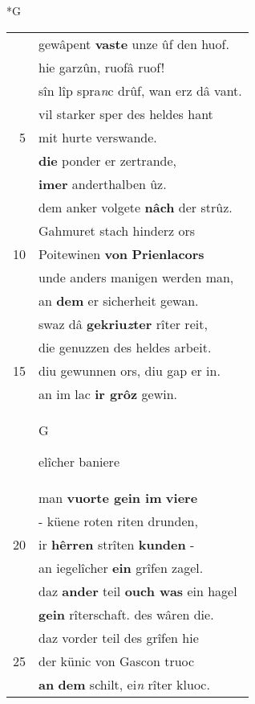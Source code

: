 \documentclass[8pt,a4paper,notitlepage]{article}
\begin{document}
\begin{table}[ht]
\begin{minipage}[t]{0.5\linewidth}
\end{minipage}
\end{table}
\newpage
\begin{table}[ht]
\begin{minipage}[t]{0.5\linewidth}
\small
\begin{center}*G
\end{center}
\begin{tabular}{rl}
 & gewâpent \textbf{vaste} unze ûf den huof.\\ 
 & hie garzûn, ruofâ ruof!\\ 
 & sîn lîp spra\textit{n}c drûf, wan erz dâ vant.\\ 
 & vil starker sper des heldes hant\\ 
5 & mit hurte verswande.\\ 
 & \textbf{die} ponder er zertrande,\\ 
 & \textbf{imer} anderthalben ûz.\\ 
 & dem anker volgete \textbf{nâch} der strûz.\\ 
 & Gahmuret stach hinderz ors\\ 
10 & Poitewinen \textbf{von} \textbf{Prienlacors}\\ 
 & unde anders manigen werden man,\\ 
 & an \textbf{dem} er sicherheit gewan.\\ 
 & swaz dâ \textbf{gekriu\textit{z}ter} rîter reit,\\ 
 & die genuzzen des heldes arbeit.\\ 
15 & diu gewunnen ors, diu gap er in.\\ 
 & an im lac \textbf{ir grôz} gewin.\\ 
 & \begin{large}G\end{large}elîcher baniere\\ 
 & man \textbf{vuorte gein im} \textbf{viere}\\ 
 & - küene roten riten drunden,\\ 
20 & ir \textbf{hêrren} strîten \textbf{kunden} -\\ 
 & an iegelîcher \textbf{ein} grîfen zagel.\\ 
 & daz \textbf{ander} teil \textbf{ouch was} ein hagel\\ 
 & \textbf{gein} rîterschaft. des wâren die.\\ 
 & daz vorder teil des grîfen hie\\ 
25 & der künic von Gascon truoc\\ 
 & \textbf{an} \textbf{dem} schilt, ei\textit{n} rîter kluoc.\\ 

\end{tabular}
\end{minipage}
\end{table}
\end{document}
